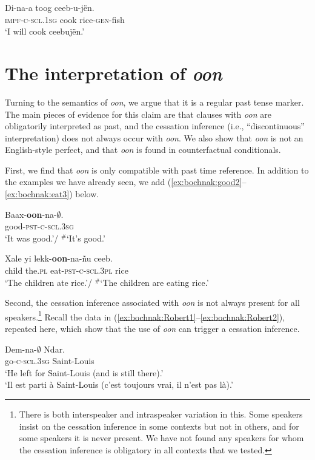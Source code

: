 \documentclass[output=paper,newtxmath,modfonts,nonflat,draftmode]{langsci/langscibook}
\begin{document}
\ea
\gll Di-na-a toog ceeb-u-j\"en.\\
\textsc{impf}-\textsc{c}-\textsc{scl.1sg}  cook rice-\textsc{gen}-fish\\
\glt `I will cook ceebuj\"en.'\label{ex:bochnak:future1}
\z


\section{The interpretation of \textit{oon}}\label{sec:bochnak:3}

Turning to the semantics of \textit{oon}, we argue that it is a
regular past tense marker. The main pieces of evidence for this claim are that clauses with \textit{oon} are obligatorily interpreted as
past, and the cessation inference (i.e., ``discontinuous'' interpretation) does not always occur with \textit{oon}. We also show that
\textit{oon} is not an English-style perfect, and that \textit{oon} is
found in counterfactual conditionals.

First, we find that \textit{oon} is only compatible with past time reference. In addition to the examples we have already seen, we add (\ref{ex:bochnak:good2}--\ref{ex:bochnak:eat3}) below.

\ea
\gll Baax-\textbf{oon}-na-$\emptyset$.\\
good-\textsc{pst}-\textsc{c}-\textsc{scl.3sg}\\
\glt `It was good.'/ $^{\#}$`It's good.'\label{ex:bochnak:good2}
\z

\ea
\gll Xale yi lekk-\textbf{oon}-na-\~nu ceeb.\\
child the.\textsc{pl} eat-\textsc{pst}-\textsc{c}-\textsc{scl.3pl} rice\\
\glt `The children ate rice.'/ $^{\#}$`The children are eating
  rice.'\label{ex:bochnak:eat3}
\z

Second, the cessation inference associated with \textit{oon} is not
always present for all speakers.\footnote{There is both interspeaker
  and intraspeaker variation in this. Some speakers insist on the
  cessation inference in some contexts but not in others, and for some
  speakers it is never present. We have not found any speakers for
  whom the cessation inference is obligatory in all contexts that we tested.} Recall the data in (\ref{ex:bochnak:Robert1}--\ref{ex:bochnak:Robert2}), repeated here, which show that the use of \textit{oon} can
trigger a cessation inference.

\ea
\gll\label{leave1-rep}Dem-na-$\emptyset$ Ndar.\\
go-\textsc{c}-\textsc{scl.3sg} Saint-Louis\\
\glt `He left for Saint-Louis (and is still there).'\\`Il est parti \`a Saint-Louis (c'est toujours vrai, il n'est
  pas l\`a).'\\\hfill\citep[279]{robert91approche}
\z
\end{document}
